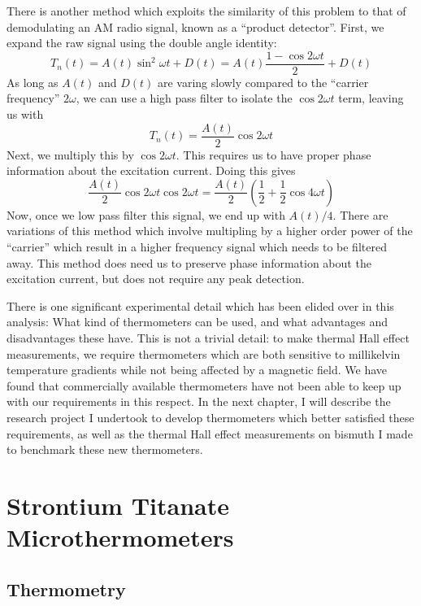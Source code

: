 \documentclass{thesis-umich}
\begin{document}
There is another method which exploits the similarity of this problem to that of demodulating an AM radio signal, known as a ``product detector''. First, we expand the raw signal using the double angle identity:
\[T_n(t) = A(t) \sin^2 \omega t + D(t) = A(t) \frac{1 - \cos 2 \omega t}{2} + D(t)\]
As long as $A(t)$ and $D(t)$ are varing slowly compared to the ``carrier frequency'' $2\omega$, we can use a high pass filter to isolate the $\cos 2\omega t$ term, leaving us with
\[T_n(t) = \frac{A(t)}{2}\cos 2\omega t\]
Next, we multiply this by $\cos 2 \omega t$. This requires us to have proper phase information about the excitation current. Doing this gives
\[ \frac{A(t)}{2} \cos 2 \omega t \cos 2 \omega t = \frac{A(t)}{2}\left(\frac{1}{2} + \frac{1}{2} \cos 4 \omega t \right) \]
Now, once we low pass filter this signal, we end up with $A(t)/4$. There are variations of this method which involve multipling by a higher order power of the ``carrier'' which result in a higher frequency signal which needs to be filtered away. This method does need us to preserve phase information about the excitation current, but does not require any peak detection.

There is one significant experimental detail which has been elided over in this analysis: What kind of thermometers can be used, and what advantages and disadvantages these have. This is not a trivial detail: to make thermal Hall effect measurements, we require thermometers which are both sensitive to millikelvin temperature gradients while not being affected by a magnetic field. We have found that commercially available thermometers have not been able to keep up with our requirements in this respect. In the next chapter, I will describe the research project I undertook to develop thermometers which better satisfied these requirements, as well as the thermal Hall effect measurements on bismuth I made to benchmark these new thermometers.

\chapter{Strontium Titanate Microthermometers}


\section{Thermometry}
\end{document}

